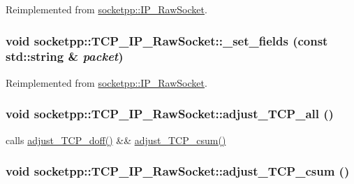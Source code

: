 Reimplemented from \hyperlink{classsocketpp_1_1IP__RawSocket_6863cc399c543073e9aa3615c3f50940}{socketpp::IP\_\-RawSocket}.\hypertarget{classsocketpp_1_1TCP__IP__RawSocket_f8f606ce33835813cc5c3a530e181432}{
\subsubsection[{\_\-set\_\-fields}]{\setlength{\rightskip}{0pt plus 5cm}void socketpp::TCP\_\-IP\_\-RawSocket::\_\-set\_\-fields (const std::string \& {\em packet})}}
\label{classsocketpp_1_1TCP__IP__RawSocket_f8f606ce33835813cc5c3a530e181432}




Reimplemented from \hyperlink{classsocketpp_1_1IP__RawSocket_c39832f1ad83184cd5ba94c4c967f465}{socketpp::IP\_\-RawSocket}.\hypertarget{classsocketpp_1_1TCP__IP__RawSocket_3644327ff72d322ff809ac432f59783b}{
\subsubsection[{adjust\_\-TCP\_\-all}]{\setlength{\rightskip}{0pt plus 5cm}void socketpp::TCP\_\-IP\_\-RawSocket::adjust\_\-TCP\_\-all ()}}
\label{classsocketpp_1_1TCP__IP__RawSocket_3644327ff72d322ff809ac432f59783b}


calls \hyperlink{classsocketpp_1_1TCP__RawSocket_029eb8bfbf19531253edf046775d9f5f}{adjust\_\-TCP\_\-doff()} \&\& \hyperlink{classsocketpp_1_1TCP__IP__RawSocket_c203b188308532333bdf53a4e18bc230}{adjust\_\-TCP\_\-csum()} 

\hypertarget{classsocketpp_1_1TCP__IP__RawSocket_c203b188308532333bdf53a4e18bc230}{
\subsubsection[{adjust\_\-TCP\_\-csum}]{\setlength{\rightskip}{0pt plus 5cm}void socketpp::TCP\_\-IP\_\-RawSocket::adjust\_\-TCP\_\-csum ()}}
\label{classsocketpp_1_1TCP__IP__RawSocket_c203b188308532333bdf53a4e18bc230}


